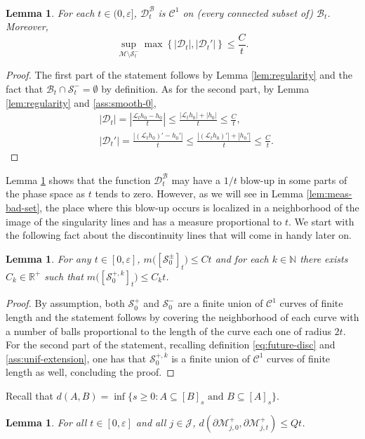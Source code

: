 \documentclass{amsart}
\numberwithin{equation}{section}
\newtheorem{lemma}[theorem]{Lemma}
\newcommand\ve{\varepsilon}
\renewcommand{\ge}{\geqslant}
\renewcommand{\le}{\leqslant}
\newcommand\cB{{\mathcal B}}
\newcommand\cC{{\mathcal C}}
\newcommand\cJ{{\mathcal J}}
\newcommand\cL{{\mathcal L}}
\newcommand\cM{{\mathcal M}}
\newcommand\cS{{\mathcal S}}
\newcommand\bN{{\mathbb N}}
\newcommand\bR{{\mathbb R}}
\newcommand{\Deriv}{\mathcal D}
\begin{document}
\begin{lemma}
  \label{lem:regularity-norms}
For each \(t \in (0, \ve]\), \(\Deriv_t^{\cB}\) is \(\cC^1\) on (every connected subset of) \(\cB_t\). Moreover,
\[
  \sup_{\cM \setminus \cS_t^{-}} \max\left\{|\Deriv_t|, |\Deriv_t'|\right\} \le \frac C t.
\]
\end{lemma}
\begin{proof}
The first part of the statement follows by Lemma \ref{lem:regularity} and the fact that \(\cB_t \cap \cS_t^{-} = \emptyset\) by definition. As for the second part, by Lemma \ref{lem:regularity} and \ref{ass:smooth-0},
\[
\begin{split}
 & |\Deriv_t| = \left|\frac{\cL_t h_0 - h_0}{t}\right | \le \frac{|\cL_t h_0| + |h_0|}{t} \le \frac{C}{t},\\
&  |\Deriv_t '| = \frac{|(\cL_t h_0 )' - h_0 '|}{t} \le \frac{|(\cL_t h_0) '| + |h_0 '|}{t} \le \frac{C}{t}.
\end{split}
\]
\end{proof}
Lemma \ref{lem:regularity-norms} shows that the function \(\Deriv^{\cB}_t\) may have a \(1/t\) blow-up in some parts of the phase space as \(t\) tends to zero. However, as we will see in Lemma \ref{lem:meas-bad-set}, the place where this blow-up occurs is localized in a neighborhood of the image of the singularity lines and has a measure proportional to \(t\). We start with the following fact about the discontinuity lines that will come in handy later on.
\begin{lemma}\label{lem:neigh}
For any \(t \in [0,\ve]\), \(m \bigl( [\cS_0^{\pm}]_{t}\bigr) \le Ct\) and for each \(k \in \bN\) there exists \(C_k \in \bR^+\) such that \(m \bigl( [\cS_0^{+,k}]_{t} \bigr)\le C_k t\).
\end{lemma}
\begin{proof}
By assumption, both \(\cS_0^{+}\) and \(\cS_0^{-}\) are a finite union of \(\cC^1\) curves of finite length and the statement follows by covering the neighborhood of each curve with a number of balls proportional to the length of the curve each one of radius \(2t\). For the second part of the statement, recalling definition \eqref{eq:future-disc} and \ref{ass:unif-extension}, one has that \(\cS_0^{+,k}\) is a finite union of \(\cC^1\) curves of finite length as well, concluding the proof.
\end{proof}
Recall that \(d(A,B) = \inf \{s \ge 0: A \subseteq [B]_s \text{ and }B \subseteq [A]_s\}\).
\begin{lemma}\label{lem:aux-aux-sing}
For all \(t \in [0, \ve]\) and all \(j \in \cJ\), \(d \left( \partial \cM_{j,0}^{+}, \partial \cM_{j,t}^{+}\right) \le Qt\).
\end{lemma}
\end{document}

